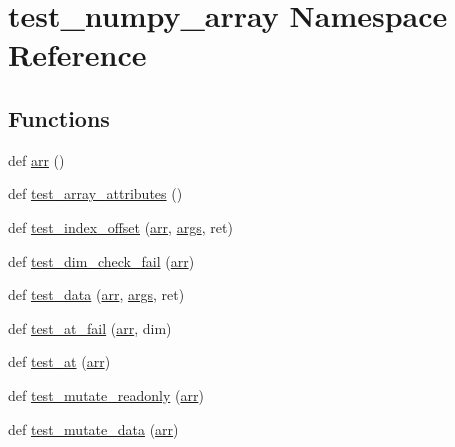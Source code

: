 \hypertarget{namespacetest__numpy__array}{}\section{test\+\_\+numpy\+\_\+array Namespace Reference}
\label{namespacetest__numpy__array}
\subsection*{Functions}
\begin{DoxyCompactItemize}
\item 
def \mbox{\hyperlink{namespacetest__numpy__array_af2b383eea3b9845ac8f4f4cf9c40fd6a}{arr}} ()
\item 
def \mbox{\hyperlink{namespacetest__numpy__array_a5bdeafb8ef0da5be993ed8517f8a7c2a}{test\+\_\+array\+\_\+attributes}} ()
\item 
def \mbox{\hyperlink{namespacetest__numpy__array_a793fa554a6ac5ce485f8a824718a71ba}{test\+\_\+index\+\_\+offset}} (\mbox{\hyperlink{test__numpy__array_8cpp_a42c56bc9bb4c61baf74b3b581765cbd9}{arr}}, \mbox{\hyperlink{classargs}{args}}, ret)
\item 
def \mbox{\hyperlink{namespacetest__numpy__array_a84053b92df95b43178ea9702b222b0ea}{test\+\_\+dim\+\_\+check\+\_\+fail}} (\mbox{\hyperlink{test__numpy__array_8cpp_a42c56bc9bb4c61baf74b3b581765cbd9}{arr}})
\item 
def \mbox{\hyperlink{namespacetest__numpy__array_a3c3765eff8704b3815a62d558bf3b328}{test\+\_\+data}} (\mbox{\hyperlink{test__numpy__array_8cpp_a42c56bc9bb4c61baf74b3b581765cbd9}{arr}}, \mbox{\hyperlink{classargs}{args}}, ret)
\item 
def \mbox{\hyperlink{namespacetest__numpy__array_a32d11e9cf58dbe01f7c839397f2021e2}{test\+\_\+at\+\_\+fail}} (\mbox{\hyperlink{test__numpy__array_8cpp_a42c56bc9bb4c61baf74b3b581765cbd9}{arr}}, dim)
\item 
def \mbox{\hyperlink{namespacetest__numpy__array_aa6cefef35056a9d0b33bcfa070d14a95}{test\+\_\+at}} (\mbox{\hyperlink{test__numpy__array_8cpp_a42c56bc9bb4c61baf74b3b581765cbd9}{arr}})
\item 
def \mbox{\hyperlink{namespacetest__numpy__array_a885babb227a9494bb4b44ba9c5c765fb}{test\+\_\+mutate\+\_\+readonly}} (\mbox{\hyperlink{test__numpy__array_8cpp_a42c56bc9bb4c61baf74b3b581765cbd9}{arr}})
\item 
def \mbox{\hyperlink{namespacetest__numpy__array_abdbfba2fa37e51cf146c1985d0e78bea}{test\+\_\+mutate\+\_\+data}} (\mbox{\hyperlink{test__numpy__array_8cpp_a42c56bc9bb4c61baf74b3b581765cbd9}{arr}})

\end{DoxyCompactItemize}
